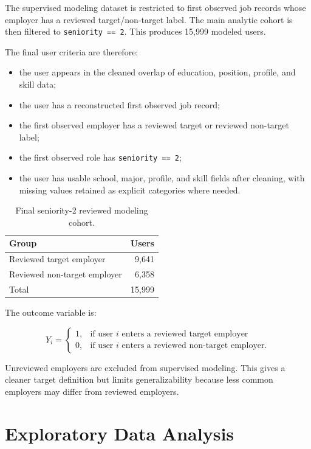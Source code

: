 \documentclass[11pt]{article}
\begin{document}
The supervised modeling dataset is restricted to first observed job records whose employer has a reviewed target/non-target label. The main analytic cohort is then filtered to \texttt{seniority == 2}. This produces 15,999 modeled users.

The final user criteria are therefore:

\begin{itemize}
    \item the user appears in the cleaned overlap of education, position, profile, and skill data;
    \item the user has a reconstructed first observed job record;
    \item the first observed employer has a reviewed target or reviewed non-target label;
    \item the first observed role has \texttt{seniority == 2};
    \item the user has usable school, major, profile, and skill fields after cleaning, with missing values retained as explicit categories where needed.
\end{itemize}

\begin{table}[H]
\centering
\caption{Final seniority-2 reviewed modeling cohort.}
\label{tab:cohort}
\begin{tabular}{lr}
\toprule
Group & Users \\
\midrule
Reviewed target employer & 9,641 \\
Reviewed non-target employer & 6,358 \\
Total & 15,999 \\
\bottomrule
\end{tabular}
\end{table}

The outcome variable is:

\[
Y_i =
\begin{cases}
1, & \text{if user } i \text{ enters a reviewed target employer} \\
0, & \text{if user } i \text{ enters a reviewed non-target employer}.
\end{cases}
\]

Unreviewed employers are excluded from supervised modeling. This gives a cleaner target definition but limits generalizability because less common employers may differ from reviewed employers.

\section{Exploratory Data Analysis}
\end{document}
